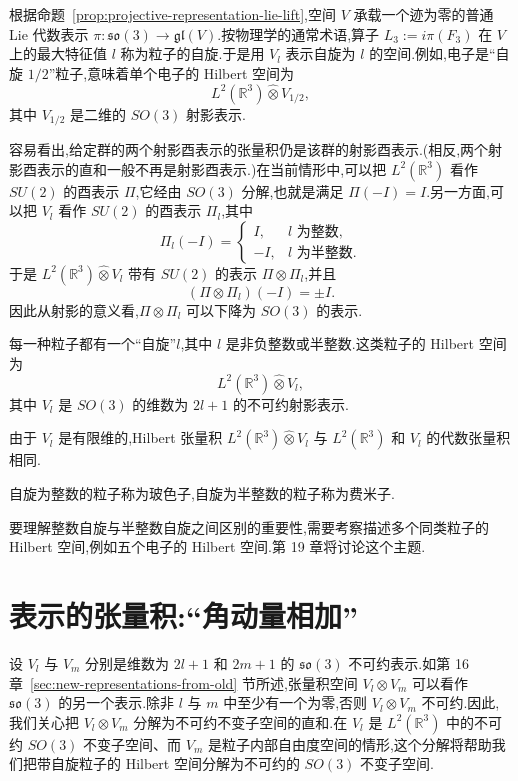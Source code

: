 根据命题~\ref{prop:projective-representation-lie-lift},空间 $V$ 承载一个迹为零的普通 Lie 代数表示 $\pi:\mathfrak{so}(3)\to\mathfrak{gl}(V)$.按物理学的通常术语,算子 $L_3:=i\pi(F_3)$ 在 $V$ 上的最大特征值 $l$ 称为粒子的自旋.于是用 $V_l$ 表示自旋为 $l$ 的空间.例如,电子是“自旋 $1/2$”粒子,意味着单个电子的 Hilbert 空间为
\[
 L^2(\mathbb R^3)\widehat\otimes V_{1/2},
\]
其中 $V_{1/2}$ 是二维的 $SO(3)$ 射影表示.

容易看出,给定群的两个射影酉表示的张量积仍是该群的射影酉表示.(相反,两个射影酉表示的直和一般不再是射影酉表示.)在当前情形中,可以把 $L^2(\mathbb R^3)$ 看作 $SU(2)$ 的酉表示 $\Pi$,它经由 $SO(3)$ 分解,也就是满足 $\Pi(-I)=I$.另一方面,可以把 $V_l$ 看作 $SU(2)$ 的酉表示 $\Pi_l$,其中
\[
 \Pi_l(-I)=\begin{cases}I,&l\text{ 为整数},\\-I,&l\text{ 为半整数}.\end{cases}
\]
于是 $L^2(\mathbb R^3)\widehat\otimes V_l$ 带有 $SU(2)$ 的表示 $\Pi\otimes\Pi_l$,并且
\[
 (\Pi\otimes\Pi_l)(-I)=\pm I.
\]
因此从射影的意义看,$\Pi\otimes\Pi_l$ 可以下降为 $SO(3)$ 的表示.

\begin{note}[自旋]\label{note:spin-summary}
每一种粒子都有一个“自旋”$l$,其中 $l$ 是非负整数或半整数.这类粒子的 Hilbert 空间为
\[
 L^2(\mathbb R^3)\widehat\otimes V_l,
\]
其中 $V_l$ 是 $SO(3)$ 的维数为 $2l+1$ 的不可约射影表示.
\end{note}

由于 $V_l$ 是有限维的,Hilbert 张量积 $L^2(\mathbb R^3)\widehat\otimes V_l$ 与 $L^2(\mathbb R^3)$ 和 $V_l$ 的代数张量积相同.

\begin{definition}[玻色子与费米子]\label{def:boson-fermion}
自旋为整数的粒子称为玻色子,自旋为半整数的粒子称为费米子.
\end{definition}

要理解整数自旋与半整数自旋之间区别的重要性,需要考察描述多个同类粒子的 Hilbert 空间,例如五个电子的 Hilbert 空间.第 19 章将讨论这个主题.

\section{表示的张量积:“角动量相加”}
\label{sec:tensor-products-angular-momentum}

设 $V_l$ 与 $V_m$ 分别是维数为 $2l+1$ 和 $2m+1$ 的 $\mathfrak{so}(3)$ 不可约表示.如第 16 章~\ref{sec:new-representations-from-old} 节所述,张量积空间 $V_l\otimes V_m$ 可以看作 $\mathfrak{so}(3)$ 的另一个表示.除非 $l$ 与 $m$ 中至少有一个为零,否则 $V_l\otimes V_m$ 不可约.因此,我们关心把 $V_l\otimes V_m$ 分解为不可约不变子空间的直和.在 $V_l$ 是 $L^2(\mathbb R^3)$ 中的不可约 $SO(3)$ 不变子空间、而 $V_m$ 是粒子内部自由度空间的情形,这个分解将帮助我们把带自旋粒子的 Hilbert 空间分解为不可约的 $SO(3)$ 不变子空间.

